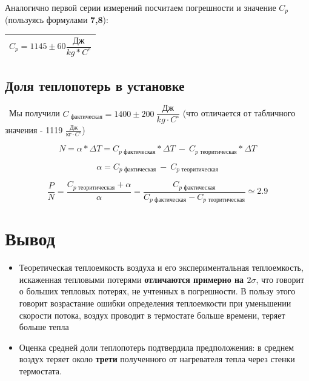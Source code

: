 \documentclass[a4paper,12pt]{article}
\theoremstyle{plain} %
\theoremstyle{definition} %
\theoremstyle{remark} %
\begin{document}
\indent Аналогично первой серии измерений посчитаем погрешности и значение $C_p$(пользуясь формулами \textbf{7,8}):\\[1ex]

\begin{center}
\begin{tabular}{|c|}
\hline 
$C_p = 1145 \pm 60 \dfrac{\text{Дж}}{kg * C^\circ} $ \\ 
\hline 
\end{tabular} 
\end{center}


\subsection{Доля теплопотерь в установке}\
\indent Мы получили $C_\text{ фактическая} = 1400 \pm 200\  \dfrac{\text{Дж}}{kg \cdot C^\circ} $ (что отличается от табличного значения - 1119 $  \frac{\text{Дж}}{\text{кг} \cdot C^\circ}$)

\begin{equation*}
N = \alpha * \Delta T = C_{p\text{ фактическая}} * \Delta T\  - \ C_{p\text{ теоритическая}} * \Delta T
\end{equation*}

\begin{equation*}
\alpha = C_{p\text{ фактическая}}\  -\  C_{p\text{ теоритическая}} 
\end{equation*}

\begin{equation*}
\frac{P}{N} = \frac{C_{p\text{ теоритическая}} + \alpha}{\alpha} =  \frac{ C_{p\text{ фактическая}}}{ C_{p\text{ фактическая}} -  C_{p\text{ теоритическая}}} \simeq 2.9
\end{equation*}

\section{Вывод}
\begin{itemize}
\item Теоретическая теплоемкость воздуха и его экспериментальная теплоемкость, искаженная тепловыми потерями \textbf{отличаются примерно на $2\sigma$}, что говорит о больших тепловых потерях, не учтенных в погрешности. В пользу этого говорит возрастание ошибки определения теплоемкости при уменьшении скорости потока, воздух проводит в термостате больше времени, теряет больше тепла

\item Оценка средней доли теплопотерь подтвердила предположения: в среднем воздух теряет около \textbf{трети} полученного от нагревателя тепла через стенки термостата.
\end{itemize}
\end{document}
